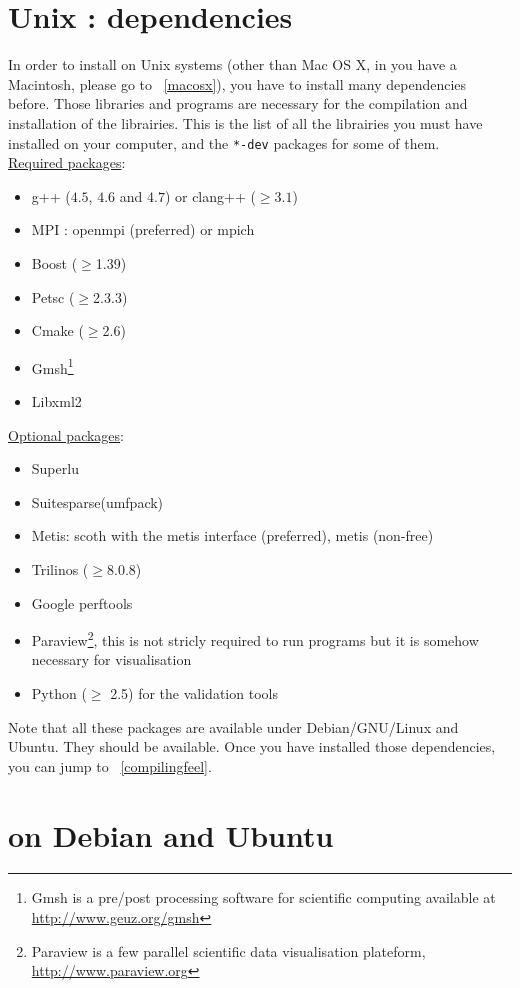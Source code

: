 \section{Unix : dependencies}
\label{sec:about-dependencies}

In order to install \feel on Unix systems (other than Mac OS X, in you have a Macintosh, please go to ~\ref{macosx}), you have to install many dependencies
before. Those libraries and programs are necessary for the
compilation and installation of the \feel librairies.
This is the list of all the librairies you must have installed on your
computer, and the \lstinline|*-dev| packages for some of them. \\
\underline{Required packages}:
\begin{itemize}
\item g++ ($4.5$, $4.6$ and $4.7$) or clang++ ($\geqslant 3.1$)
\item MPI : openmpi (preferred) or mpich
\item Boost ($\geq$1.39)
\item Petsc ($\geq$2.3.3)
\item Cmake ($\geq$2.6)
\item Gmsh\footnote{Gmsh is a pre/post processing software for scientific
computing available at \url{http://www.geuz.org/gmsh}}
\item Libxml2
\end{itemize}
\underline{Optional packages}:
\begin{itemize}
\item Superlu
\item Suitesparse(umfpack)
\item Metis: scoth with the metis interface (preferred), metis (non-free)
\item Trilinos ($\geq$8.0.8)
\item Google perftools
\item Paraview\footnote{Paraview is a few parallel scientific data
    visualisation plateform, \url{http://www.paraview.org}}, this is
  not stricly required to run \feel programs but it is somehow
  necessary for visualisation
\item Python ($\geq$ 2.5) for the validation tools
\end{itemize}
Note that all these packages are available under Debian/GNU/Linux and
Ubuntu. They should be available. Once you have installed those dependencies, you can jump to ~\ref{compilingfeel}.

\section{\feel on Debian and Ubuntu}
\label{sec:feel-debian-ubuntu}

